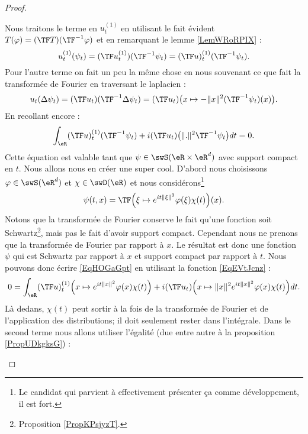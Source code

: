 \begin{proof}
\begin{subproof}
        Nous traitons le terme en \( u_t^{(1)}\) en utilisant le fait évident \( T(\varphi)=(\TF T)(\TF^{-1}\varphi)\) et en remarquant le lemme \ref{LemWRoRPIX} :
        \begin{equation}
            u_t^{(1)}(\psi_t)=(\TF u_t^{(1)})(\TF^{-1}\psi_t)=(\TF u)_t^{(1)}(\TF^{-1}\psi_t).
        \end{equation}
        Pour l'autre terme on fait un peu la même chose en nous souvenant ce que fait la transformée de Fourier en traversant le laplacien :
        \begin{equation}
            u_t(\Delta\psi_t)=(\TF u_t)(\TF^{-1}\Delta\psi_t)=(\TF u_t)\big( x\mapsto -\| x \|^2(\TF^{-1}\psi_t)(x) \big).
        \end{equation}
        En recollant encore :
        \begin{equation}    \label{EqHOGaGpt}
            \int_{\eR}(\TF u)^{(1)}_t(\TF^{-1}\psi_t)+i(\TF u_t)\big( \| . \|^2\TF^{-1}\psi_t \big)dt=0.
        \end{equation}
        Cette équation est valable tant que \( \psi\in \swS(\eR\times\eR^d)\) avec support compact en \( t\). Nous allons nous en créer une super cool. D'abord nous choisissons \( \varphi\in\swS(\eR^d)\) et \( \chi\in\swD(\eR)\) et nous considérons\footnote{Le candidat qui parvient à effectivement présenter ça comme développement, il est fort.}
        \begin{equation}    \label{EqEVtJcnz}
            \psi(t,x)=\TF\Big( \xi\mapsto  e^{it\| \xi \|^2}\varphi(\xi)\chi(t) \Big)(x).
        \end{equation}
        Notons que la transformée de Fourier conserve le fait qu'une fonction soit Schwartz\footnote{Proposition \ref{PropKPsjyzT}.}, mais pas le fait d'avoir support compact. Cependant nous ne prenons que la transformée de Fourier par rapport à \( x\). Le résultat est donc une fonction \( \psi\) qui est Schwartz par rapport à \( x\) et support compact par rapport à \( t\). Nous pouvons donc écrire \eqref{EqHOGaGpt} en utilisant la fonction \eqref{EqEVtJcnz} :
        \begin{equation}    \label{EqHPUyZFz}
            0=\int_{\eR}(\TF u)_t^{(1)}\Big( x\mapsto e^{it\| x \|^2}\varphi(x)\chi(t) \Big)+i(\TF u_t)\Big( x\mapsto\| x \|^2 e^{it\| x \|^2}\varphi(x)\chi(t) \Big)dt.
        \end{equation}
        Là dedans, \( \chi(t)\) peut sortir à la fois de la transformée de Fourier et de l'application des distributions; il doit seulement rester dans l'intégrale. Dans le second terme nous allons utiliser l'égalité (due entre autre à la proposition \ref{PropUDkgksG}) :

\end{subproof}
\end{proof}
